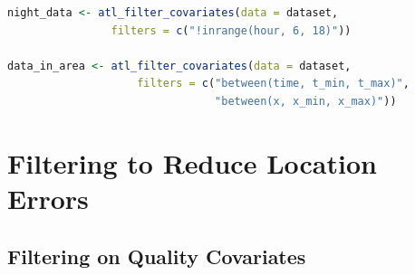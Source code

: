\documentclass[10pt,paper=a4,headings=standardclasses
]{scrartcl}
\begin{document}
\begin{lstlisting}[float, language=R, style=customR, caption = {
    The \texttt{atl\_filter\_covariates} function can be used both as a simple temporal filter, and also as a combined spatio-temporal filter. 
    Filter predicates are passed to the \texttt{filters} argument as a character vector, each of which is then evaluated as an \texttt{R} expression in the context of the data supplied. 
    Only rows in the data satisfying all the conditions passed as filters are retained. 
    Users must make sure the filter variables exist in their dataset.
    Here, the first example shows how nighttime data can be retained using a predicate (\texttt{inrange} from \texttt{data.table}) that determine whether the value of `hour' is between 6 and 18. 
    The \texttt{!} sign indicates that the negative of the predicate should be returned, i.e., \texttt{TRUE} when the hour is between 6 PM and 6 AM, but \texttt{FALSE} when the hour is between 6 AM and 6 PM.
    The second example shows the use of multiple filter statements; this data will be filtered to be within the range of times bounded by \texttt{t\_min} and \texttt{t\_max}, and with X coordinates between \texttt{x\_min} and \texttt{x\_max}.
    The \texttt{between} function is from \texttt{data.table}.}]
night_data <- atl_filter_covariates(data = dataset,
                filters = c("!inrange(hour, 6, 18)"))

data_in_area <- atl_filter_covariates(data = dataset,
                    filters = c("between(time, t_min, t_max)",
                                "between(x, x_min, x_max)"))
\end{lstlisting}

\section{Filtering to Reduce Location Errors}

\subsection{Filtering on Quality Covariates}
\end{document}
